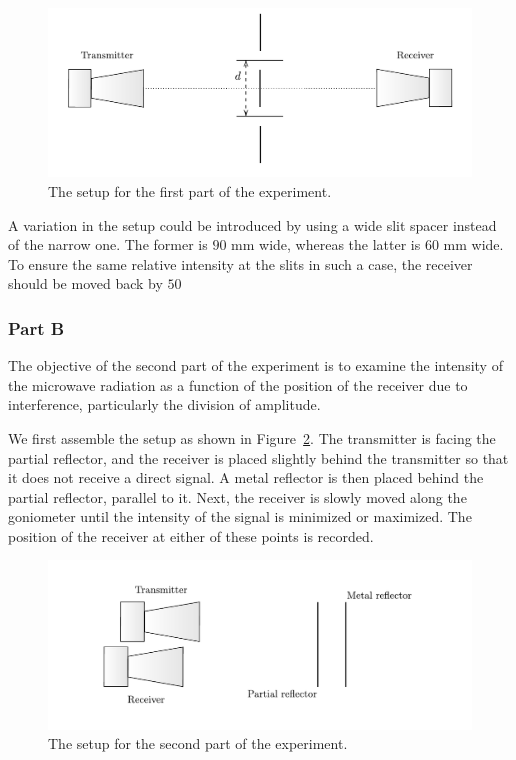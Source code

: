\documentclass[10pt]{article}
\begin{document}
\begin{figure}[hbt!]
  \centering
  \includegraphics[scale=0.6]{figures/f1.pdf}
  \caption{The setup for the first part of the experiment.}
  \label{fig:1}
\end{figure}

A variation in the setup could be introduced by using a wide slit spacer instead of the narrow one. The former is $90$ mm wide, whereas the latter is $60$ mm wide. To ensure the same relative intensity at the slits in such a case, the receiver should be moved back by $50$%

\subsubsection*{Part B}

The objective of the second part of the experiment is to examine the intensity of the microwave radiation as a function of the position of the receiver due to interference, particularly the division of amplitude.

We first assemble the setup as shown in Figure~\ref{fig:2}. The transmitter is facing the partial reflector, and the receiver is placed slightly behind the transmitter so that it does not receive a direct signal. A metal reflector is then placed behind the partial reflector, parallel to it. Next, the receiver is slowly moved along the goniometer until the intensity of the signal is minimized or maximized. The position of the receiver at either of these points is recorded. 

\begin{figure}[hbt!]
  \centering
  \includegraphics[scale=0.6]{figures/f2.pdf}
  \caption{The setup for the second part of the experiment.}
  \label{fig:2}
\end{figure}
\end{document}
